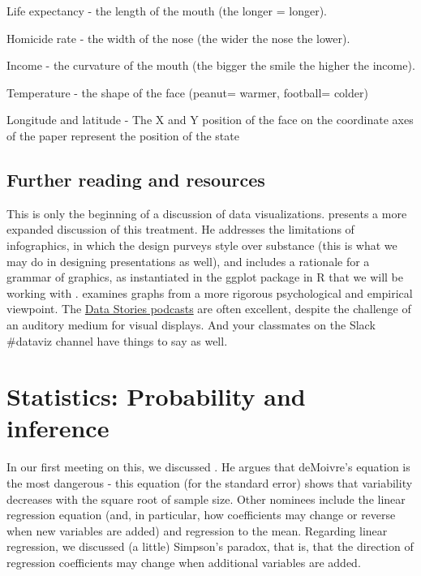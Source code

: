 \documentclass[]{book}
\theoremstyle{definition}
\theoremstyle{definition}
\theoremstyle{definition}
\theoremstyle{remark}
\begin{document}
Life expectancy - the length of the mouth (the longer = longer).

Homicide rate - the width of the nose (the wider the nose the lower).

Income - the curvature of the mouth (the bigger the smile the higher the
income).

Temperature - the shape of the face (peanut= warmer, football= colder)

Longitude and latitude - The X and Y position of the face on the
coordinate axes of the paper represent the position of the state

\section{Further reading and
resources}\label{further-reading-and-resources}

This is only the beginning of a discussion of data visualizations.
\citet{healy2018viz} presents a more expanded discussion of this
treatment. He addresses the limitations of infographics, in which the
design purveys style over substance (this is what we may do in designing
presentations as well), and includes a rationale for a grammar of
graphics, as instantiated in the ggplot package in R that we will be
working with \citep{wickham2016r}. \citet{cleveland1985graphical}
examines graphs from a more rigorous psychological and empirical
viewpoint. The \href{http://datastori.es/}{Data Stories podcasts} are
often excellent, despite the challenge of an auditory medium for visual
displays. And your classmates on the Slack \#dataviz channel have things
to say as well.

\chapter{Statistics: Probability and
inference}\label{statistics-probability-and-inference}

In our first meeting on this, we discussed \citet{wainer2007most}. He
argues that deMoivre's equation is the most dangerous - this equation
(for the standard error) shows that variability decreases with the
square root of sample size. Other nominees include the linear regression
equation (and, in particular, how coefficients may change or reverse
when new variables are added) and regression to the mean. Regarding
linear regression, we discussed (a little) Simpson's paradox, that is,
that the direction of regression coefficients may change when additional
variables are added.
\end{document}
